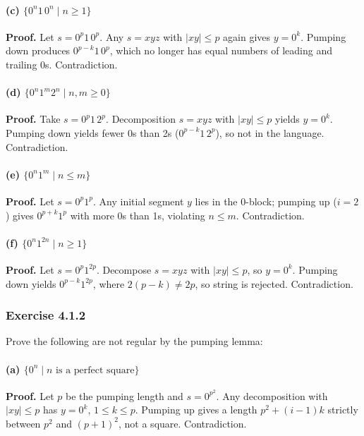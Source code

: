 \documentclass{article}
\theoremstyle{theorem}
\theoremstyle{definition}
\theoremstyle{remark}
\begin{document}
\paragraph{(c) \(\{0^n1\,0^n\mid n\ge1\}\)}
\textbf{Proof.} Let \(s=0^p1\,0^p\). Any \(s=xyz\) with \(\lvert xy\rvert\le p\) again gives \(y=0^k\). Pumping down produces \(0^{p-k}1\,0^p\), which no longer has equal numbers of leading and trailing 0s. Contradiction.

\paragraph{(d) \(\{0^n1^m2^n\mid n,m\ge0\}\)}
\textbf{Proof.} Take \(s=0^p1\,2^p\). Decomposition \(s=xyz\) with \(\lvert xy\rvert\le p\) yields \(y=0^k\). Pumping down yields fewer 0s than 2s (\(0^{p-k}1\,2^p\)), so not in the language. Contradiction.

\paragraph{(e) \(\{0^n1^m\mid n\le m\}\)}
\textbf{Proof.} Let \(s=0^p1^p\). Any initial segment \(y\) lies in the 0-block; pumping up (\(i=2\)) gives \(0^{p+k}1^p\) with more 0s than 1s, violating \(n\le m\). Contradiction.

\paragraph{(f) \(\{0^n1^{2n}\mid n\ge1\}\)}
\textbf{Proof.} Let \(s=0^p1^{2p}\). Decompose \(s=xyz\) with \(\lvert xy\rvert\le p\), so \(y=0^k\). Pumping down yields \(0^{p-k}1^{2p}\), where \(2(p-k)\neq2p\), so string is rejected. Contradiction.

\subsubsection*{Exercise 4.1.2}
Prove the following are not regular by the pumping lemma:

\paragraph{(a) \(\{0^n\mid n\text{ is a perfect square}\}\)}
\textbf{Proof.} Let \(p\) be the pumping length and \(s=0^{p^2}\). Any decomposition with \(\lvert xy\rvert\le p\) has \(y=0^k\), \(1\le k\le p\). Pumping up gives a length \(p^2 + (i-1)k\) strictly between \(p^2\) and \((p+1)^2\), not a square. Contradiction.
\end{document}

